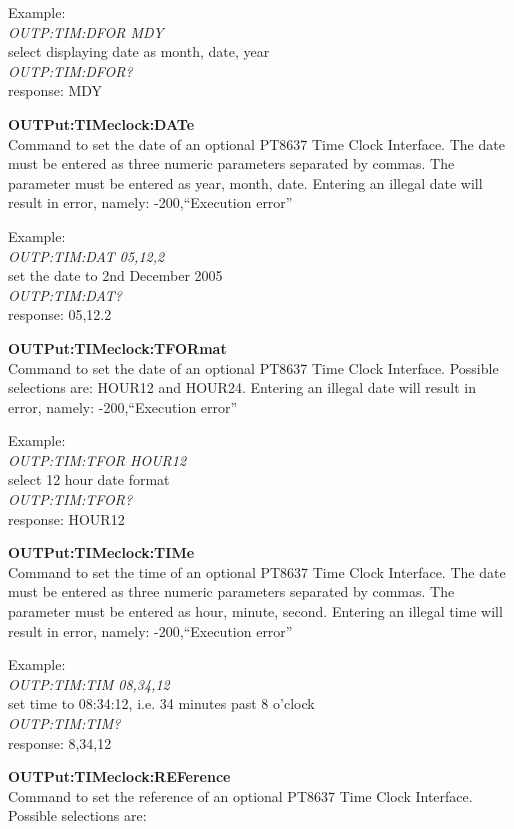 Example:\\
\textit{OUTP:TIM:DFOR MDY}\\
select displaying date as month, date, year\\
\textit{OUTP:TIM:DFOR?}\\
response: MDY

\textbf{OUTPut:TIMeclock:DATe}\\
Command to set the date of an optional PT8637 Time Clock Interface. The date must be entered as three numeric parameters separated by commas. The parameter must be entered as year, month, date. Entering an illegal date will result in error, namely: -200,``Execution error''

Example:\\
\textit{OUTP:TIM:DAT 05,12,2}\\
set the date to 2nd December 2005\\
\textit{OUTP:TIM:DAT?}\\
response: 05,12.2

\textbf{OUTPut:TIMeclock:TFORmat}\\
Command to set the date of an optional PT8637 Time Clock Interface. Possible selections are: HOUR12 and HOUR24. Entering an illegal date will result in error, namely: -200,``Execution error''

Example:\\
\textit{OUTP:TIM:TFOR HOUR12}\\
select 12 hour date format\\
\textit{OUTP:TIM:TFOR?}\\
response: HOUR12

\textbf{OUTPut:TIMeclock:TIMe}\\
Command to set the time of an optional PT8637 Time Clock Interface. The date must be entered as three numeric parameters separated by commas. The parameter must be entered as hour, minute, second. Entering an illegal time will result in error, namely: -200,``Execution error''

Example:\\
\textit{OUTP:TIM:TIM 08,34,12}\\
set time to 08:34:12, i.e. 34 minutes past 8 o'clock\\
\textit{OUTP:TIM:TIM?}\\
response: 8,34,12

\textbf{OUTPut:TIMeclock:REFerence}\\
Command to set the reference of an optional PT8637 Time Clock Interface. Possible selections are:

